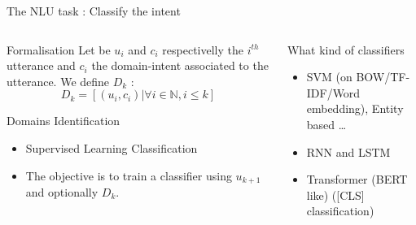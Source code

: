 \documentclass[10pt,aspectratio=169]{beamer}
\begin{document}
\begin{frame}{The NLU task : Classify the intent}
    \begin{columns}
        \begin{column}{0.5\textwidth}
    \begin{block}{Formalisation}
        Let be $u_i$ and $c_i$ respectivelly the $i^{th}$ utterance and $c_i$ the domain-intent associated to the utterance. We define $D_k$ :
        $$
            D_k = [(u_i, c_i) | \forall i \in \mathbb{N}, i \leq k]
        $$
    \end{block}
    \begin{block}{Domains Identification}
    
        \begin{itemize}
            \item Supervised Learning Classification
            \item The objective is to train a classifier using $u_{k+1}$ and optionally $D_k$.
        \end{itemize}
    \end{block}
    \end{column}
        \begin{column}{0.5\textwidth}
            \begin{block}{What kind of classifiers}
                \begin{itemize}
                    \item SVM (on BOW/TF-IDF/Word embedding), Entity based \ldots
                    \item RNN and LSTM 
                    \item Transformer (BERT like) \cite{wu-2020-tod} ([CLS] classification)
                \end{itemize}
                
            \end{block}
        \end{column}
    \end{columns}
\end{frame}
\end{document}
